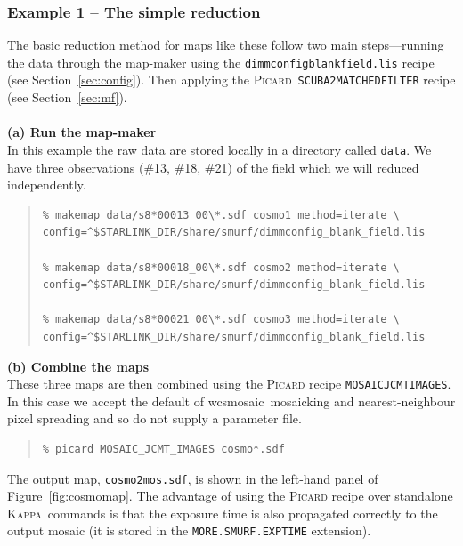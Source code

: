 \documentclass[twoside,11pt]{article}
\newcommand{\htmlref}[2]{#1}
\newcommand{\latexhtml}[2]{#1}
\newcommand{\xref}[3]{#1}
\renewcommand{\_}{\texttt{\symbol{95}}}
\newenvironment{myquote}{
   \color{MidnightBlue}\begin{quote}\begin{small}}{
   \end{small}\end{quote}
}
\newcommand{\Kappa}{\xref{\textsc{Kappa}}{sun95}{}}
\newcommand{\picard}{\xref{\textsc{Picard}}{sun265}{}}
\newcommand{\drrecipe}[1]{\texttt{#1}}
\newcommand{\task}[1]{\textsf{#1}}
\newcommand{\file}[1]{\texttt{#1}}
\newcommand{\wcsmosaic}{\xref{\task{wcsmosaic}}{sun95}{WCSMOSAIC}}
\newcommand{\cref}[3]{\latexhtml{#1~\ref{#2}}{\htmlref{#3}{#2}}}
\renewenvironment{myquote}{
      \begin{quote}\begin{small}}{
      \end{small}\end{quote}
   }
\begin{document}
\subsubsection{Example 1 -- The simple reduction}
The basic reduction method for maps like these follow two main
steps---running the data through the map-maker using the
\file{dimmconfig\_blank\_field.lis} recipe (see
\cref{Section}{sec:config}{Specialised configuration files}). Then
applying the \picard\ \drrecipe{SCUBA2\_MATCHED\_FILTER} recipe (see
\cref{Section}{sec:mf}{Point-source extraction}).
\\ \\
\textbf{(a) Run the map-maker}\\
In this example the raw data are stored locally in a directory called
\file{data}. We have three observations (\#13, \#18, \#21) of the field
which we will reduced independently.

\begin{myquote}
\begin{verbatim}
% makemap data/s8*00013_00\*.sdf cosmo1 method=iterate \
config=^$STARLINK_DIR/share/smurf/dimmconfig_blank_field.lis

% makemap data/s8*00018_00\*.sdf cosmo2 method=iterate \
config=^$STARLINK_DIR/share/smurf/dimmconfig_blank_field.lis

% makemap data/s8*00021_00\*.sdf cosmo3 method=iterate \
config=^$STARLINK_DIR/share/smurf/dimmconfig_blank_field.lis

\end{verbatim}
\end{myquote}

\textbf{(b) Combine the maps}\\
These three maps are then combined using the \textsc{Picard} recipe
\xref{\drrecipe{MOSAIC\_JCMT\_IMAGES}}{sun265}{MOSAIC_JCMT_IMAGES}. In
this case we accept the default of \wcsmosaic\ mosaicking and
nearest-neighbour pixel spreading and so do not supply a parameter
file.
\begin{myquote}
\begin{verbatim}
% picard MOSAIC_JCMT_IMAGES cosmo*.sdf
\end{verbatim}
\end{myquote}
The output map, \file{cosmo2\_mos.sdf}, is shown in the left-hand
panel of \cref{Figure}{fig:cosmomap}{the figure below}. The advantage of using the
\textsc{Picard} recipe over standalone \Kappa\ commands is that the exposure
time is also propagated correctly to the output mosaic (it is stored
in the \texttt{MORE.SMURF.EXP\_TIME} extension).
\\
\end{document}
